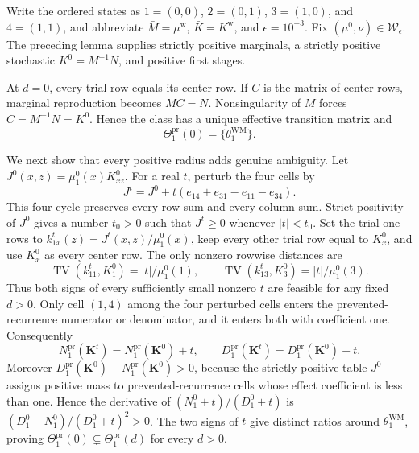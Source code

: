 Write the ordered states as \(1=(0,0)\), \(2=(0,1)\), \(3=(1,0)\), and \(4=(1,1)\), and abbreviate \(\bar M=\mu^{\mathrm w}\), \(\bar K=K^{\mathrm w}\), and \(\epsilon=10^{-3}\).  Fix \((\mu^0,\nu)\in\mathcal W_{\epsilon}\).  The preceding lemma supplies strictly positive marginals, a strictly positive stochastic \(K^0=M^{-1}N\), and positive first stages.

At \(d=0\), every trial row equals its center row.  If \(C\) is the matrix of center rows, marginal reproduction becomes \(MC=N\).  Nonsingularity of \(M\) forces \(C=M^{-1}N=K^0\).  Hence the class has a unique effective transition matrix and
\[
 \Theta_1^{\mathrm{pr}}(0)=\{\theta_1^{\mathrm{WM}}\}.
\]

We next show that every positive radius adds genuine ambiguity.  Let
\(J^0(x,z)=\mu_1^0(x)K^0_{xz}\).  For a real \(t\), perturb the four cells by
\[
 J^t=J^0+t(e_{14}+e_{31}-e_{11}-e_{34}).
\]
This four-cycle preserves every row sum and every column sum.  Strict positivity of \(J^0\) gives a number \(t_0>0\) such that \(J^t\ge0\) whenever \(|t|<t_0\).  Set the trial-one rows to \(k^t_{1x}(z)=J^t(x,z)/\mu_1^0(x)\), keep every other trial row equal to \(K^0_x\), and use \(K^0_x\) as every center row.  The only nonzero rowwise distances are
\[
 \operatorname{TV}(k^t_{11},K^0_1)=|t|/\mu_1^0(1),
 \qquad
 \operatorname{TV}(k^t_{13},K^0_3)=|t|/\mu_1^0(3).
\]
Thus both signs of every sufficiently small nonzero \(t\) are feasible for any fixed \(d>0\).  Only cell \((1,4)\) among the four perturbed cells enters the prevented-recurrence numerator or denominator, and it enters both with coefficient one.  Consequently
\[
 N_1^{\mathrm{pr}}(\mathbf K^t)=N_1^{\mathrm{pr}}(\mathbf K^0)+t,
 \qquad
 D_1^{\mathrm{pr}}(\mathbf K^t)=D_1^{\mathrm{pr}}(\mathbf K^0)+t.
\]
Moreover \(D_1^{\mathrm{pr}}(\mathbf K^0)-N_1^{\mathrm{pr}}(\mathbf K^0)>0\), because the strictly positive table \(J^0\) assigns positive mass to prevented-recurrence cells whose effect coefficient is less than one.  Hence the derivative of \((N_1^0+t)/(D_1^0+t)\) is \((D_1^0-N_1^0)/(D_1^0+t)^2>0\).  The two signs of \(t\) give distinct ratios around \(\theta_1^{\mathrm{WM}}\), proving
\(\Theta_1^{\mathrm{pr}}(0)\subsetneq\Theta_1^{\mathrm{pr}}(d)\) for every \(d>0\).

